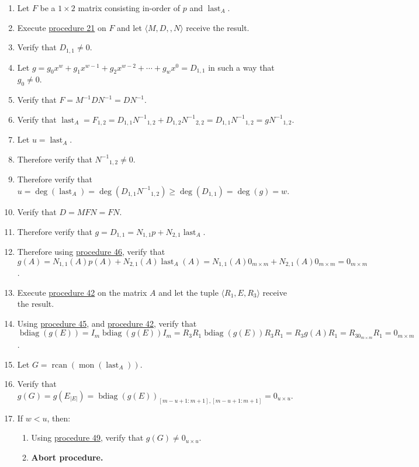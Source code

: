\documentclass[twocolumn]{article}
\DeclareMathOperator{\bdiag}{bdiag}
\DeclareMathOperator{\rcan}{rcan}
\DeclareMathOperator{\mon}{mon}
\DeclareMathOperator{\last}{last}
\begin{document}
				\begin{enumerate}
					\item Let $F$ be a $1\times 2$ matrix consisting in-order of $p$ and $\last_A$.
					\item Execute \hyperref[sec:procedure 21]{procedure 21} on $F$ and let $\langle M,D,,N\rangle$ receive the result.
					\item Verify that $D_{1,1}\ne 0$.
					\item Let $g=g_0x^w+g_1x^{w-1}+g_2x^{w-2}+\cdots+g_wx^0=D_{1,1}$ in such a way that $g_0\ne 0$.
					\item Verify that $F=M^{-1}DN^{-1}=DN^{-1}$.
					\item Verify that $\last_A=F_{1,2}=D_{1,1}{N^{-1}}_{1,2}+D_{1,2}{N^{-1}}_{2,2}=D_{1,1}{N^{-1}}_{1,2}=g{N^{-1}}_{1,2}$.
					\item Let $u=\last_A$.
					\item Therefore verify that ${N^{-1}}_{1,2}\ne 0$.
					\item Therefore verify that $u=\deg(\last_A)=\deg(D_{1,1}{N^{-1}}_{1,2})\ge\deg(D_{1,1})=\deg(g)=w$.
					\item Verify that $D=MFN=FN$.
					\item Therefore verify that $g=D_{1,1}=N_{1,1}p+N_{2,1}\last_A$.
					\item Therefore using \hyperref[sec:procedure 46]{procedure 46}, verify that $g(A)=N_{1,1}(A)p(A)+N_{2,1}(A)\last_A(A)=N_{1,1}(A)0_{m\times m}+N_{2,1}(A)0_{m\times m}=0_{m\times m}$.
					\item Execute \hyperref[sec:procedure 42]{procedure 42} on the matrix $A$ and let the tuple $\langle R_1,E,R_3\rangle$ receive the result.
					\item Using \hyperref[sec:procedure 45]{procedure 45}, and \hyperref[sec:procedure 42]{procedure 42}, verify that $\bdiag(g(E))=I_m\bdiag(g(E))I_m=R_3R_1\bdiag(g(E))R_3R_1=R_3g(A)R_1=R_30_{m\times m}R_1=0_{m\times m}$.
					\item Let $G=\rcan(\mon(\last_A))$.
					\item Verify that $g(G)=g(E_{\lvert E\rvert})=\bdiag(g(E))_{[m-u+1:m+1],[m-u+1:m+1]}=0_{u\times u}$.
					\item If $w<u$, then:
					\begin{enumerate}
						\item Using \hyperref[sec:procedure 49]{procedure 49}, verify that $g(G)\ne 0_{u\times u}$.
						\item \textbf{Abort procedure.}
					\end{enumerate}

\end{enumerate}
\end{document}
